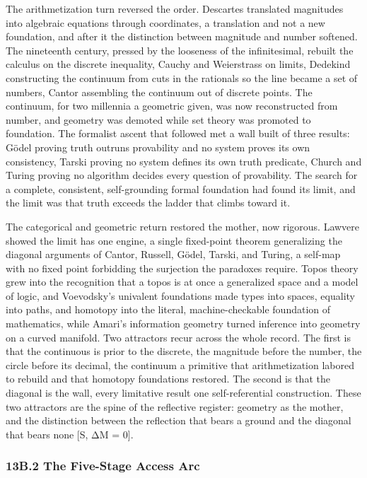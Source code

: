 \documentclass[10pt,twocolumn]{article}
\begin{document}
The arithmetization turn reversed the order. Descartes translated
magnitudes into algebraic equations through coordinates, a translation
and not a new foundation, and after it the distinction between magnitude
and number softened. The nineteenth century, pressed by the looseness of
the infinitesimal, rebuilt the calculus on the discrete inequality,
Cauchy and Weierstrass on limits, Dedekind constructing the continuum
from cuts in the rationals so the line became a set of numbers, Cantor
assembling the continuum out of discrete points. The continuum, for two
millennia a geometric given, was now reconstructed from number, and
geometry was demoted while set theory was promoted to foundation. The
formalist ascent that followed met a wall built of three results: Gödel
proving truth outruns provability and no system proves its own
consistency, Tarski proving no system defines its own truth predicate,
Church and Turing proving no algorithm decides every question of
provability. The search for a complete, consistent, self-grounding
formal foundation had found its limit, and the limit was that truth
exceeds the ladder that climbs toward it.

The categorical and geometric return restored the mother, now rigorous.
Lawvere showed the limit has one engine, a single fixed-point theorem
generalizing the diagonal arguments of Cantor, Russell, Gödel, Tarski,
and Turing, a self-map with no fixed point forbidding the surjection the
paradoxes require. Topos theory grew into the recognition that a topos
is at once a generalized space and a model of logic, and Voevodsky's
univalent foundations made types into spaces, equality into paths, and
homotopy into the literal, machine-checkable foundation of mathematics,
while Amari's information geometry turned inference into geometry on a
curved manifold. Two attractors recur across the whole record. The first
is that the continuous is prior to the discrete, the magnitude before
the number, the circle before its decimal, the continuum a primitive
that arithmetization labored to rebuild and that homotopy foundations
restored. The second is that the diagonal is the wall, every limitative
result one self-referential construction. These two attractors are the
spine of the reflective register: geometry as the mother, and the
distinction between the reflection that bears a ground and the diagonal
that bears none {[}S, ΔM = 0{]}.

\hypertarget{b.2-the-five-stage-access-arc}{%
\subsubsection{13B.2 The Five-Stage Access
Arc}\label{b.2-the-five-stage-access-arc}}
\end{document}
